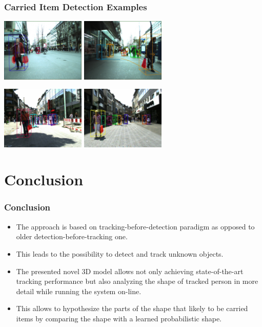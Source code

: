 \documentclass{beamer}
\begin{document}
\begin{frame}
\frametitle{Carried Item Detection Examples} 
\begin{center}
  	\includegraphics[width=4cm]{items1.jpg} \hspace{0.5cm}
  	\includegraphics[width=4cm]{items2.jpg}
\end{center}
\begin{center}
  	\includegraphics[width=4cm]{items3.jpg} \hspace{0.5cm}
  	\includegraphics[width=4cm]{items4.jpg}
\end{center}

\end{frame}

\section{Conclusion}
\begin{frame}
\frametitle{Conclusion} 
\begin{itemize}
	\item The approach is based on tracking-before-detection paradigm as opposed to older detection-before-tracking one.
	\item This leads to the possibility to detect and track unknown objects.
	\item The presented novel 3D model allows not only achieving state-of-the-art tracking performance but also analyzing the shape of tracked person in more detail while running the system on-line.
	\item This allows to hypothesize the parts of the shape that likely to be carried items by comparing the shape with a learned probabilistic shape.
\end{itemize}
\end{frame}
\end{document}
